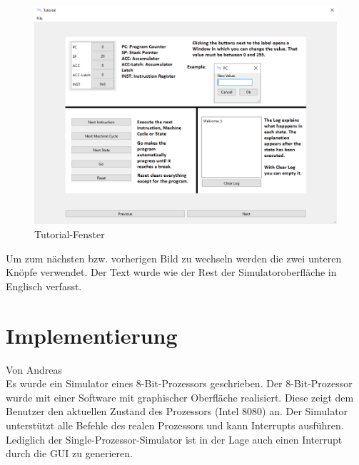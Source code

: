 \documentclass[12pt]{article}
\begin{document}
\begin{figure}[H]
\centering
\includegraphics[width=15cm]{bilder/Tutorial}
\caption{Tutorial-Fenster}
\label{fig:Tutorial}
\end{figure}

\noindent
Um zum nächsten bzw. vorherigen Bild zu wechseln werden die zwei unteren Knöpfe verwendet. Der Text wurde wie der Rest der Simulatoroberfläche in Englisch verfasst.

\newpage

\section{Implementierung}
Von Andreas\\

\noindent
Es wurde ein Simulator eines 8-Bit-Prozessors geschrieben.
Der 8-Bit-Prozessor wurde mit einer Software mit graphischer Oberfläche realisiert. Diese zeigt dem Benutzer den aktuellen Zustand des Prozessors (Intel 8080) an. Der Simulator unterstützt alle Befehle des realen Prozessors und kann Interrupts ausführen. Lediglich der Single-Prozessor-Simulator ist in der Lage auch einen Interrupt durch die GUI zu generieren.
\end{document}
